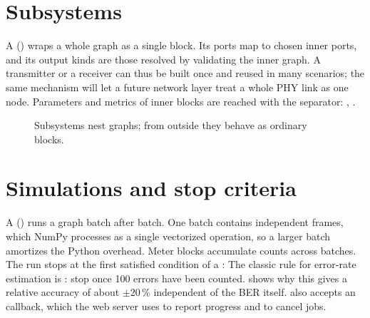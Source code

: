 \section{Subsystems}\label{sec:subsystems}
A  () wraps a whole graph as a single block.
Its ports map to chosen inner ports, and its output kinds are those resolved by validating the
inner graph. A transmitter or a receiver can thus be built once and reused in many scenarios;
the same mechanism will let a future network layer treat a whole PHY link as one node.
Parameters and metrics of inner blocks are reached with the  separator:
, .

\begin{figure}[htbp]
\centering
{}
\caption{Subsystems nest graphs; from outside they behave as ordinary blocks.}
\end{figure}

\section{Simulations and stop criteria}\label{sec:simulation}
A  () runs a graph batch after batch. One batch
contains  independent frames, which NumPy processes as a single vectorized
operation, so a larger batch amortizes the Python overhead. Meter blocks accumulate counts
across batches. The run stops at the first satisfied condition of a :
The classic rule for error-rate estimation is :
stop once 100 errors have been counted.  shows why this gives a relative
accuracy of about $\pm20\,\%$ independent of the BER itself.  also accepts an
 callback, which the web server uses to report progress and to cancel jobs.

